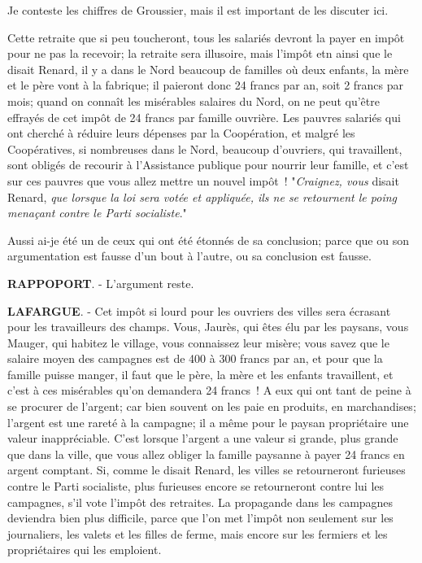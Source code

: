\documentclass[french,twoside]{book} %
\begin{document}
Je conteste les chiffres de Groussier, mais il est important de les discuter ici.\par
Cette retraite que si peu toucheront, tous les salariés devront la payer en impôt pour ne pas la recevoir; la retraite sera illusoire, mais l’impôt etn ainsi que le disait Renard, il y a dans le Nord beaucoup de familles où deux enfants, la mère et le père vont à la fabrique; il paieront donc 24 francs par an, soit 2 francs par mois; quand on connaît les misérables salaires du Nord, on ne peut qu’être effrayés de cet impôt de 24 francs par famille ouvrière. Les pauvres salariés qui ont cherché à réduire leurs dépenses par la Coopération, et malgré les Coopératives, si nombreuses dans le Nord, beaucoup d’ouvriers, qui travaillent, sont obligés de recourir à l’Assistance publique pour nourrir leur famille, et c’est sur ces pauvres que vous allez mettre un nouvel impôt ! "\emph{Craignez, vous} disait Renard, \emph{que lorsque la loi sera votée et appliquée, ils ne se retournent le poing menaçant contre le Parti socialiste}."\par
Aussi ai-je été un de ceux qui ont été étonnés de sa conclusion; parce que ou son argumentation est fausse d’un bout à l’autre, ou sa conclusion est fausse.\par
\textbf{RAPPOPORT}. - L'argument reste.\par
\textbf{LAFARGUE}. - Cet impôt si lourd pour les ouvriers des villes sera écrasant pour les travailleurs des champs. Vous, Jaurès, qui êtes élu par les paysans, vous Mauger, qui habitez le village, vous connaissez leur misère; vous savez que le salaire moyen des campagnes est de 400 à 300 francs par an, et pour que la famille puisse manger, il faut que le père, la mère et les enfants travaillent, et c’est à ces misérables qu’on demandera 24 francs ! A eux qui ont tant de peine à se procurer de l’argent; car bien souvent on les paie en produits, en marchandises; l’argent est une rareté à la campagne; il a même pour le paysan propriétaire une valeur inappréciable. C'est lorsque l’argent a une valeur si grande, plus grande que dans la ville, que vous allez obliger la famille paysanne à payer 24 francs en argent comptant. Si, comme le disait Renard, les villes se retourneront furieuses contre le Parti socialiste, plus furieuses encore se retourneront contre lui les campagnes, s’il vote l’impôt des retraites. La propagande dans les campagnes deviendra bien plus difficile, parce que l’on met l’impôt non seulement sur les journaliers, les valets et les filles de ferme, mais encore sur les fermiers et les propriétaires qui les emploient.\par
\end{document}
